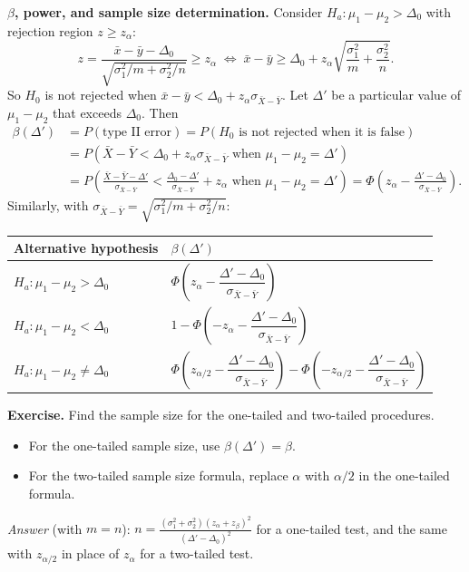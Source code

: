 \textbf{$\beta$, power, and sample size determination.}
Consider $H_a:\mu_1-\mu_2>\Delta_0$ with rejection region $z\ge z_\alpha$:
\[
z = \frac{\bar{x}-\bar{y}-\Delta_0}{\sqrt{\sigma_1^2/m+\sigma_2^2/n}} \ge z_\alpha
\;\Leftrightarrow\; \bar{x}-\bar{y}\ge \Delta_0 + z_\alpha\sqrt{\frac{\sigma_1^2}{m}+\frac{\sigma_2^2}{n}} .
\]
So $H_0$ is not rejected when $\bar{x}-\bar{y}<\Delta_0+z_\alpha\sigma_{\bar{X}-\bar{Y}}$.
Let $\Delta'$ be a particular value of $\mu_1-\mu_2$ that exceeds $\Delta_0$. Then
\begin{align*}
\beta(\Delta') &= P(\text{type II error}) = P(H_0 \text{ is not rejected when it is false})\\
&= P\!\left(\bar{X}-\bar{Y}<\Delta_0+z_\alpha\sigma_{\bar{X}-\bar{Y}} \text{ when } \mu_1-\mu_2=\Delta'\right)\\
&= P\!\left(\frac{\bar{X}-\bar{Y}-\Delta'}{\sigma_{\bar{X}-\bar{Y}}} < \frac{\Delta_0-\Delta'}{\sigma_{\bar{X}-\bar{Y}}}+z_\alpha \text{ when } \mu_1-\mu_2=\Delta'\right)
= \Phi\!\left(z_\alpha - \frac{\Delta'-\Delta_0}{\sigma_{\bar{X}-\bar{Y}}}\right).
\end{align*}
Similarly, with $\sigma_{\bar{X}-\bar{Y}}=\sqrt{\sigma_1^2/m+\sigma_2^2/n}$:

\begin{center}
\begin{tabular}{ll}
\toprule
Alternative hypothesis & $\beta(\Delta')$\\
\midrule
$H_a:\mu_1-\mu_2>\Delta_0$   & $\Phi\!\left(z_\alpha - \dfrac{\Delta'-\Delta_0}{\sigma_{\bar{X}-\bar{Y}}}\right)$\\[3ex]
$H_a:\mu_1-\mu_2<\Delta_0$   & $1-\Phi\!\left(-z_\alpha - \dfrac{\Delta'-\Delta_0}{\sigma_{\bar{X}-\bar{Y}}}\right)$\\[3ex]
$H_a:\mu_1-\mu_2\ne\Delta_0$ & $\Phi\!\left(z_{\alpha/2} - \dfrac{\Delta'-\Delta_0}{\sigma_{\bar{X}-\bar{Y}}}\right) - \Phi\!\left(-z_{\alpha/2} - \dfrac{\Delta'-\Delta_0}{\sigma_{\bar{X}-\bar{Y}}}\right)$\\
\bottomrule
\end{tabular}
\end{center}

\textbf{Exercise.} Find the sample size for the one-tailed and two-tailed procedures.
\begin{itemize}
  \item For the one-tailed sample size, use $\beta(\Delta')=\beta$.
  \item For the two-tailed sample size formula, replace $\alpha$ with $\alpha/2$ in the one-tailed formula.
\end{itemize}
\emph{Answer} (with $m=n$): $\displaystyle n=\frac{(\sigma_1^2+\sigma_2^2)(z_\alpha+z_\beta)^2}{(\Delta'-\Delta_0)^2}$ for a one-tailed test, and the same with $z_{\alpha/2}$ in place of $z_\alpha$ for a two-tailed test.

